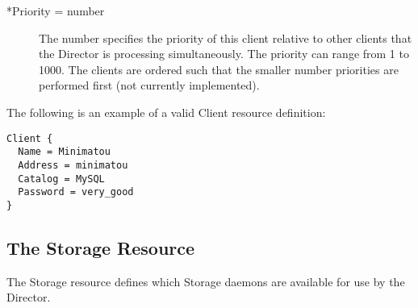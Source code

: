 \begin{description}
\item [*Priority = \lt{}number\gt{}]
   The number specifies the  priority of this client relative to other clients
that the  Director is processing simultaneously. The priority can range  from
1 to 1000. The clients are ordered such that the smaller  number priorities
are performed first (not currently  implemented). 
\end{description}

The following is an example of a valid Client resource definition: 

\footnotesize
\begin{verbatim}
Client {
  Name = Minimatou
  Address = minimatou
  Catalog = MySQL
  Password = very_good
}
\end{verbatim}
\normalsize

\subsection*{The Storage Resource}
\label{StorageResource2}

The Storage resource defines which Storage daemons are available for use by
the Director. 

